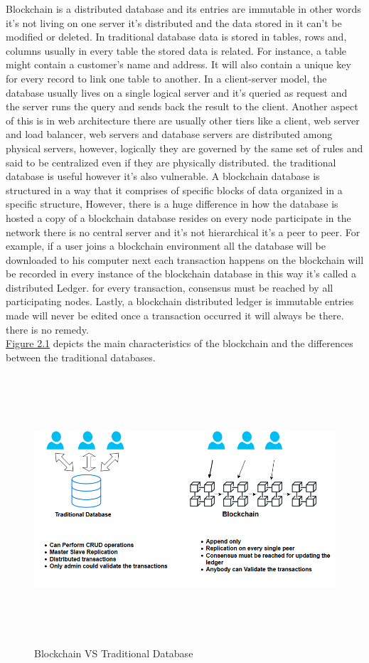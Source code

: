 Blockchain is a distributed database and its entries are immutable in other words it's not living on one server it's distributed and the data stored in it can't be modified or deleted. In traditional database data is stored in tables, rows and, columns usually in every table the stored data is related. 
For instance, a table might contain a customer's name and address. It will also contain a unique key for every record to link one table to another.
In a client-server model, the database usually lives on a single logical server and it's queried as request and the server runs the query and sends back the result to the client. Another aspect of this is in web architecture there are usually other tiers like a client, web server and load balancer, web servers and database servers are distributed among physical servers, however, logically they are governed by the same set of rules and said to be centralized even if they are physically distributed. the traditional database is useful however it's also vulnerable.
A blockchain database is structured in a way that it comprises of specific blocks of data organized in a specific structure, However, there is a huge difference in how the database is hosted a copy of a blockchain database resides on every node participate in the network there is no central server and it's not hierarchical it's a peer to peer. For example, if a user joins a blockchain environment all the database will be downloaded to his computer next each transaction happens on the blockchain will be recorded in every instance of the blockchain database in this way it's called a distributed Ledger. 
for every transaction, consensus must be reached by all participating nodes.
Lastly, a blockchain distributed ledger is immutable entries made will never be edited once a transaction occurred it will always be there. there is no remedy.  \\ 
 \hyperref[fig:bcvsdb]{Figure 2.1} depicts the main characteristics of the blockchain and the differences between the traditional databases.
\begin{figure}[H]
	\includegraphics[width=15cm,height=10cm]{images/bcvsdb.png}
	\caption{Blockchain VS Traditional Database}
	\label{fig:bcvsdb}
	\end{figure}



